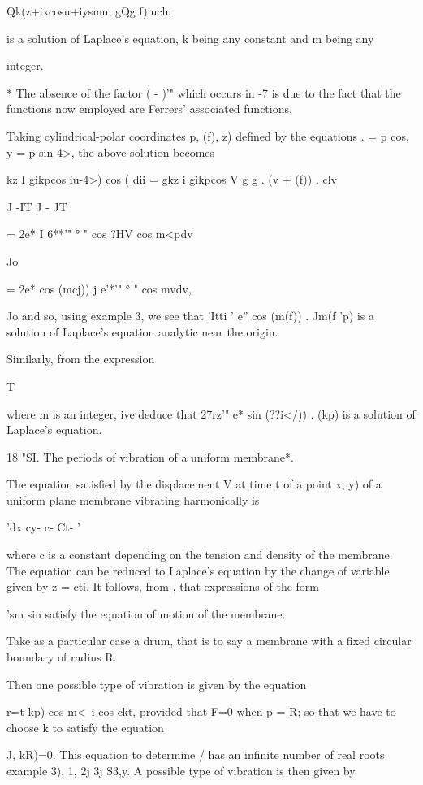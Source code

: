Qk(z+ixcosu+iysmu, gQg f)iuclu

is a solution of Laplace's equation, k being any constant and m being
any

integer.

* The absence of the factor ( - )'" which occurs in -7 is due to
the fact that the functions now employed are Ferrers' associated
functions.

%
%

Taking cylindrical-polar coordinates p, (f), z) defined by the
equations . = p cos, y = p sin 4>, the above solution becomes

 kz I gikpcos iu-4>) cos ( dii = gkz i gikpcos V g g . (v + (f)) . clv

J -IT J - JT

= 2e* I 6**'" ° " cos ?HV cos m<pdv

Jo

= 2e* cos (mcj)) j e'*'" ° " cos mvdv,

Jo and so, using  example 3, we see that 'Itti ' e'' cos (m(f))
. Jm(f 'p) is a solution of Laplace's equation analytic near the
origin.

Similarly, from the expression

T

where m is an integer, ive deduce that 27rz'" e* sin (??i</)) . (kp)
is a solution of Laplace's equation.

18 "SI. The periods of vibration of a uniform membrane*.

The equation satisfied by the displacement V at time t of a point x,
y) of a uniform plane membrane vibrating harmonically is

'dx cy- c- Ct- '

where c is a constant depending on the tension and density of the
membrane. The equation can be reduced to Laplace's equation by the
change of variable given by z = cti. It follows, from , that
expressions of the form

'sm sin satisfy the equation of motion of the membrane.

Take as a particular case a drum, that is to say a membrane with a
fixed circular boundary of radius R.

Then one possible type of vibration is given by the equation

r=t kp) cos m<\ i cos ckt, provided that F=0 when p = R; so that we
have to choose k to satisfy the equation

J, kR)=0. This equation to determine / has an infinite number of real
roots  example 3), 1, 2j 3j  S3,y. A possible type of
vibration is then given by

